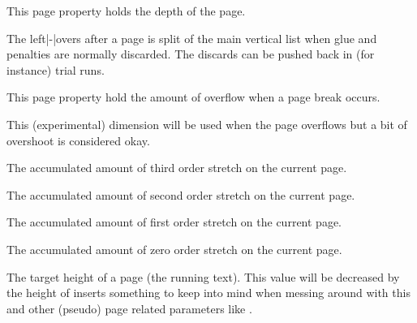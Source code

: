 \stopnewprimitive

\startnewprimitive[title={\prm {pagedepth}}]

This page property holds the depth of the page.

\stopnewprimitive

\startoldprimitive[title={\prm {pagediscards}}]

The left|-|overs after a page is split of the main vertical list when glue and
penalties are normally discarded. The discards can be pushed back in (for
instance) trial runs.

\stopoldprimitive

\startnewprimitive[title={\prm {pageexcess}}]

This page property hold the amount of overflow when a page break occurs.

\stopnewprimitive

\startnewprimitive[title={\prm {pageextragoal}}]

This (experimental) dimension will be used when the page overflows but a bit of
overshoot is considered okay.

\stopnewprimitive

\startoldprimitive[title={\prm {pagefilllstretch}}]

The accumulated amount of third order stretch on the current page.

\stopoldprimitive

\startoldprimitive[title={\prm {pagefillstretch}}]

The accumulated amount of second order stretch on the current page.

\stopoldprimitive

\startoldprimitive[title={\prm {pagefilstretch}}]

The accumulated amount of first order stretch on the current page.

\stopoldprimitive

\startnewprimitive[title={\prm {pagefistretch}}]

The accumulated amount of zero order stretch on the current page.

\stopnewprimitive

\startoldprimitive[title={\prm {pagegoal}}]

The target height of a page (the running text). This value will be decreased by
the height of inserts something to keep into mind when messing around with this
and other (pseudo) page related parameters like .


